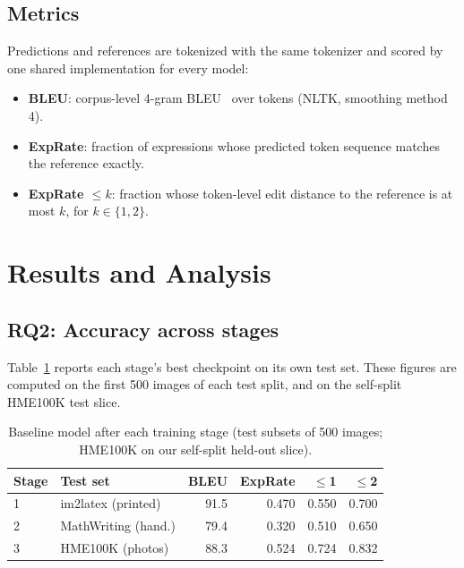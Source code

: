 \documentclass[conference]{IEEEtran}
\begin{document}
\subsection{Metrics}
Predictions and references are tokenized with the same tokenizer and scored by one shared implementation for every model:
\begin{itemize}
\item \textbf{BLEU}: corpus-level 4-gram BLEU~\cite{papineni2002bleu} over tokens (NLTK, smoothing method 4).
\item \textbf{ExpRate}: fraction of expressions whose predicted token sequence matches the reference exactly.
\item \textbf{ExpRate $\le k$}: fraction whose token-level edit distance to the reference is at most $k$, for $k\in\{1,2\}$.
\end{itemize}

\section{Results and Analysis}\label{sec:results}

\subsection{RQ2: Accuracy across stages}
Table~\ref{tab:stages} reports each stage's best checkpoint on its own test set. These figures are computed on the first 500 images of each test split, and on the self-split HME100K test slice.

\begin{table}[t]
\caption{Baseline model after each training stage (test subsets of 500 images; HME100K on our self-split held-out slice).}
\label{tab:stages}
\centering
\setlength{\tabcolsep}{4pt}
\begin{tabular}{llrrrr}
\toprule
Stage & Test set & BLEU & ExpRate & $\le$1 & $\le$2 \\
\midrule
1 & im2latex (printed) & 91.5 & 0.470 & 0.550 & 0.700 \\
2 & MathWriting (hand.) & 79.4 & 0.320 & 0.510 & 0.650 \\
3 & HME100K (photos) & 88.3 & 0.524 & 0.724 & 0.832 \\
\bottomrule
\end{tabular}
\end{table}
\end{document}
